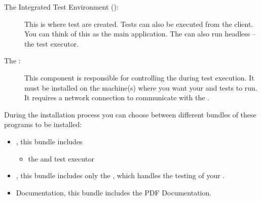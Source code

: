 \begin{description}
\item [The Integrated Test Environment (\ite{}): ]{This is where test are created. Tests can also be executed from the client. You can think of this as the main application. The \ite{} can also run headless -- the test executor.}
\item [The \gdagent{}:]{ This component is responsible for controlling the \gdaut{} during test execution. It must be installed on the machine(s) where you want your \gdaut{} and tests to run. It requires a network connection to communicate with the \ite{}. }
\end{description}

During the installation process you can choose between different bundles of these programs to be installed:

\begin{itemize}
\item \app{}, this bundle includes
	\begin{itemize}
	\item the \ite{} and test executor
	\end{itemize}
\item \gdagent{}, this bundle includes only the \gdagent{}, which handles the testing
of your \gdaut{}.
\item \app{} Documentation, this bundle includes the PDF Documentation.
\end{itemize}


 
